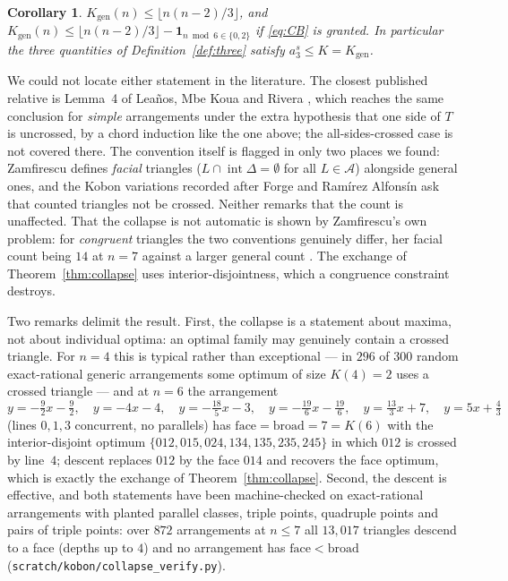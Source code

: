 \documentclass[11pt]{article}
\newtheorem{corollary}[theorem]{Corollary}
\theoremstyle{definition}
\newcommand{\Kgen}{K_{\mathrm{gen}}}
\newcommand{\intr}{\operatorname{int}}
\begin{document}
\begin{corollary}\label{cor:fk}
$\Kgen(n)\le\lfloor n(n-2)/3\rfloor$, and $\Kgen(n)\le
\lfloor n(n-2)/3\rfloor-\mathbf 1_{n\bmod 6\in\{0,2\}}$ if \eqref{eq:CB} is
granted. In particular the three quantities of
Definition~\ref{def:three} satisfy $a_3^s\le K=\Kgen$.
\end{corollary}

We could not locate either statement in the literature. The closest
published relative is Lemma~4 of Leaños, Mbe Koua and Rivera \cite{LMR2010},
which reaches the same conclusion for \emph{simple} arrangements under the
extra hypothesis that one side of $T$ is uncrossed, by a chord induction like
the one above; the all-sides-crossed case is not covered there. The
convention itself is flagged in only two places we found: Zamfirescu
\cite{Zam2018} defines \emph{facial} triangles ($L\cap\intr\Delta=\emptyset$
for all $L\in\mathcal A$) alongside general ones, and the Kobon variations
recorded after Forge and Ram\'irez Alfons\'in \cite{FRA1998} ask that counted
triangles not be crossed. Neither remarks that the count is unaffected.
That the collapse is not automatic is shown by Zamfirescu's own problem: for
\emph{congruent} triangles the two conventions genuinely differ, her facial
count being $14$ at $n=7$ against a larger general count \cite{Zam2018}. The
exchange of Theorem~\ref{thm:collapse} uses interior-disjointness, which a
congruence constraint destroys.

Two remarks delimit the result. First, the collapse is a statement about
maxima, not about individual optima: an optimal family may genuinely contain
a crossed triangle. For $n=4$ this is typical rather than exceptional --- in
$296$ of $300$ random exact-rational generic arrangements some optimum of
size $K(4)=2$ uses a crossed triangle --- and at $n=6$ the arrangement
\[
 y=-\tfrac92x-\tfrac92,\quad y=-4x-4,\quad y=-\tfrac{18}5x-3,\quad
 y=-\tfrac{19}6x-\tfrac{19}6,\quad y=\tfrac{13}3x+7,\quad y=5x+\tfrac43
\]
(lines $0,1,3$ concurrent, no parallels) has
$\mathrm{face}=\mathrm{broad}=7=K(6)$ with the interior-disjoint optimum
$\{012,015,024,134,135,235,245\}$ in which $012$ is crossed by line~$4$;
descent replaces $012$ by the face $014$ and recovers the face optimum, which
is exactly the exchange of Theorem~\ref{thm:collapse}. Second, the
descent is effective, and both statements have been machine-checked on
exact-rational arrangements with planted parallel classes, triple points,
quadruple points and pairs of triple points: over $872$ arrangements at
$n\le7$ all $13{,}017$ triangles descend to a face (depths up to $4$) and no
arrangement has $\mathrm{face}<\mathrm{broad}$
(\texttt{scratch/kobon/collapse\_verify.py}).
\end{document}
